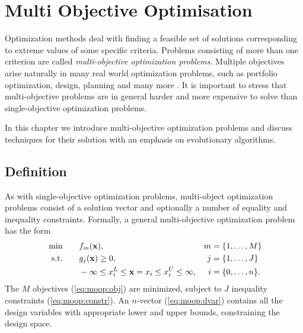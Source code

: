 

\chapter{Multi Objective Optimisation}
\label{chp:moo}

Optimization methods deal with finding a feasible set of solutions
  corresponding to extreme values of some specific criteria.
  Problems consisting of more than one criterion are called
  \textit{multi-objective optimization problems}.
Multiple objectives arise naturally in many real world optimization problems,
  such as portfolio optimization, design, planning and many more
  \cite{pgnl:06,zepv:00,gala:98,yrss:09,basi:05}.
It is important to stress that multi-objective problems are in general harder
  and more expensive to solve than single-objective optimization problems.

In this chapter we introduce multi-objective optimization problems and discuss
  techniques for their solution with an emphasis on evolutionary algorithms.


\section{Definition}

As with single-objective optimization problems, multi-object optimization
  problems consist of a solution vector and optionally a number of equality
  and inequality constraints.
Formally, a general multi-objective optimization problem has the form
%
\begin{align}
  \text{ min} \quad & \quad f_m({\bf x}), ~& m &= \{1, \dots, M\} \label{eq:moop:obj}\\
  \text{s.t.} \quad & \quad g_j({\bf x}) \geq 0, & j &= \{1, \dots, J\}
  \label{eq:moop:constr}\\
  \quad & \quad  -\infty \leq x_i^L \leq {\bf x}=x_i \leq x_i^U \leq \infty,& i &= \{0, \dots, n \}
  \label{eq:moop:dvar} \text{.}
\end{align}
%
The $M$ objectives (\ref{eq:moop:obj}) are minimized, subject to $J$
  inequality constraints (\ref{eq:moop:constr}).
An $n$-vector (\ref{eq:moop:dvar}) contains all the design variables with
  appropriate lower and upper bounds, constraining the design space.

